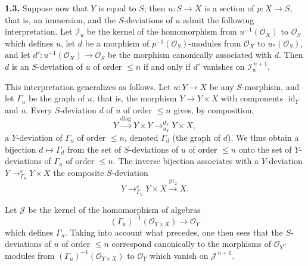
\medskip
\noindent\textbf{1.3.}
\label{sga3:VIIA:1.3}
Suppose now that \(Y\) is equal to \(S\); then \(u:S\to X\) is a
section of \(p:X\to S\), that is, an immersion, and the
\(S\)-deviations of \(u\) admit the following interpretation. Let
\(\mathcal I_u\) be the kernel of the homomorphism from
\(u^{-1}(\mathcal O_X)\) to \(\mathcal O_S\) which defines \(u\), let
\(d\) be a morphism of \(p^{-1}(\mathcal O_S)\)-modules from
\(\mathcal O_X\) to \(u_*(\mathcal O_S)\), and let
\(d':u^{-1}(\mathcal O_X)\to\mathcal O_S\) be the morphism canonically
associated with \(d\). Then \(d\) is an \(S\)-deviation of \(u\) of
order \(\leq n\) if and only if \(d'\) vanishes on
\(\mathcal I_u^{\,n+1}\).

This interpretation generalizes as follows. Let \(u:Y\to X\) be any
\(S\)-morphism, and let \(\Gamma_u\) be the graph of \(u\), that is,
the morphism \(Y\to Y\times X\) with components \(\operatorname{id}_Y\)
and \(u\). Every \(S\)-deviation \(d\) of \(u\) of order \(\leq n\)
gives, by composition,
\[
  Y\xrightarrow{\mathrm{diag}}Y\times Y
   \mathop{\longrightarrow}^{d_Y}_{u_Y}Y\times X,
\]
a \(Y\)-deviation of \(\Gamma_u\) of order \(\leq n\), denoted
\(\Gamma_d\) (the graph of \(d\)). We thus obtain a bijection
\(d\mapsto\Gamma_d\) from the set of \(S\)-deviations of \(u\) of order
\(\leq n\) onto the set of \(Y\)-deviations of \(\Gamma_u\) of order
\(\leq n\). The inverse bijection associates with a \(Y\)-deviation
\(Y\mathop{\longrightarrow}^{e}_{\Gamma_u}Y\times X\) the composite
\(S\)-deviation
\[
 Y\mathop{\longrightarrow}^{e}_{\Gamma_u}Y\times X
  \xrightarrow{\operatorname{pr}_2}X.
\]

Let \(\mathcal J\) be the kernel of the homomorphism of algebras
\[
  (\Gamma_u)^{-1}(\mathcal O_{Y\times X})\longrightarrow\mathcal O_Y
\]
which defines \(\Gamma_u\). Taking into account what precedes, one
then sees that the \(S\)-deviations of \(u\) of order \(\leq n\)
correspond canonically to the morphisms of \(\mathcal O_Y\)-modules from
\((\Gamma_u)^{-1}(\mathcal O_{Y\times X})\) to \(\mathcal O_Y\) which
vanish on \(\mathcal J^{\,n+1}\).

